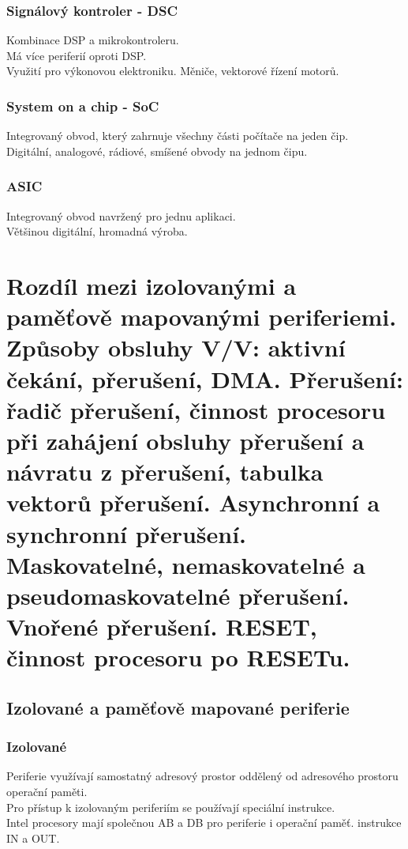 \subsubsection*{Signálový kontroler - DSC}
Kombinace DSP a mikrokontroleru.\\
Má více periferií oproti DSP. \\
Využití pro výkonovou elektroniku. Měniče, vektorové řízení motorů.\\

\subsubsection*{System on a chip - SoC}
Integrovaný obvod, který zahrnuje všechny části počítače na jeden čip. \\
Digitální, analogové, rádiové, smíšené obvody na jednom čipu. \\

\subsubsection*{ASIC}
Integrovaný obvod navržený pro jednu aplikaci.\\
Většinou digitální, hromadná výroba.\\


\section{Rozdíl mezi izolovanými a paměťově mapovanými periferiemi. Způsoby obsluhy V/V: aktivní čekání, přerušení, DMA.
  Přerušení: řadič přerušení, činnost procesoru při zahájení obsluhy přerušení a návratu z přerušení, tabulka vektorů přerušení. Asynchronní a synchronní přerušení. Maskovatelné, nemaskovatelné a pseudomaskovatelné přerušení. Vnořené přerušení. RESET, činnost procesoru po RESETu.}
\subsection{Izolované a paměťově mapované periferie}
\subsubsection{Izolované}
Periferie využívají samostatný adresový prostor oddělený od adresového prostoru operační paměti.\\
Pro přístup k izolovaným periferiím se používají speciální instrukce.\\
Intel procesory mají společnou AB a DB pro periferie i operační paměť. instrukce IN a OUT.

